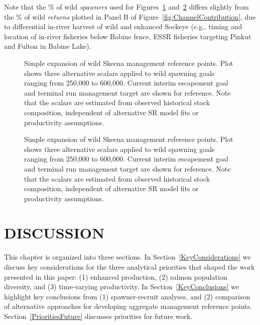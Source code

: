 \documentclass[french,11pt]{book}
\begin{document}
Note that the \% of wild \emph{spawners} used for Figures~\ref{fig:SkeenaExp1} and~\ref{fig:SkeenaExp2} differs slightly from the \% of wild \emph{returns} plotted in Panel B of Figure~\ref{fig:ChannelContribution}, due to differential in-river harvest of wild and enhanced Sockeye (e.g., timing and location of in-river fisheries below Babine fence, ESSR fisheries targeting Pinkut and Fulton in Babine Lake).


\begin{figure}[htb]

{\centering {} 

}

\caption{Simple expansion of wild Skeena management reference points. Plot shows three alternative scalars applied to wild spawning goals ranging from 250,000 to 600,000. Current interim escapement goal and terminal run management target are shown for reference. Note that the scalars are estimated from observed historical stock composition, independent of alternative SR model fits or productivity assumptions.}\label{fig:SkeenaExp1}
\end{figure}
\clearpage


\begin{figure}[htb]

{\centering {} 

}

\caption{Simple expansion of wild Skeena management reference points. Plot shows three alternative scalars applied to wild spawning goals ranging from 250,000 to 600,000. Current interim escapement goal and terminal run management target are shown for reference. Note that the scalars are estimated from observed historical stock composition, independent of alternative SR model fits or productivity assumptions.}\label{fig:SkeenaExp2}
\end{figure}
\clearpage

\section{DISCUSSION}\label{discussion}

This chapter is organized into three sections. In Section~\ref{KeyConsiderations} we discuss key considerations for the three analytical priorities that shaped the work presented in this paper: (1) enhanced production, (2) salmon population diversity, and (3) time-varying productivity. In Section~\ref{KeyConclusions} we highlight key conclusions from (1) spawner-recruit analyses, and (2) comparison of alternative approaches for developing aggregate management reference points. Section~\ref{PrioritiesFuture} discusses priorities for future work.
\end{document}
